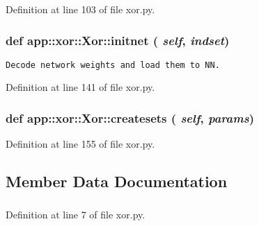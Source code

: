 Definition at line 103 of file xor.py.
\subsubsection{\setlength{\rightskip}{0pt plus 5cm}def app::xor::Xor::initnet ( {\em self},  {\em indset})}\label{classapp_1_1xor_1_1Xor_7ca357fbf6bb15fe69f00a8d84031682}




\footnotesize\begin{verbatim}
Decode network weights and load them to NN.
\end{verbatim}
\normalsize
 

Definition at line 141 of file xor.py.
\subsubsection{\setlength{\rightskip}{0pt plus 5cm}def app::xor::Xor::createsets ( {\em self},  {\em params})}\label{classapp_1_1xor_1_1Xor_ae030bef61fa55f22f639a2ee1ecfb24}




Definition at line 155 of file xor.py.

\subsection{Member Data Documentation}
\subsubsection{}\label{classapp_1_1xor_1_1Xor_fcd83e60592ac925e17aeb3c4a0639aa}




Definition at line 7 of file xor.py.
\subsubsection{}\label{classapp_1_1xor_1_1Xor_ccfbd552709ff07c7210f286c5be9ee3}




